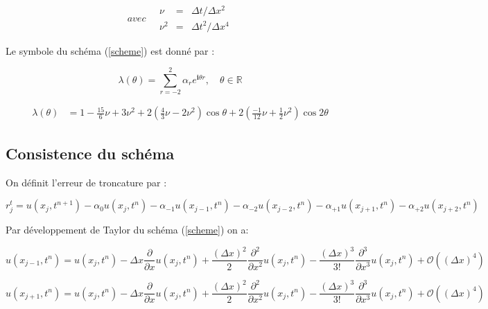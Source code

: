 \documentclass[a4paper,11pt]{article}
\begin{document}
\begin{equation*}
    avec \quad
    \begin{array}{rcl}
        \nu &=& \Delta t/\Delta x^{2} \\
        \nu^{2} &=& \Delta t^{2}/\Delta x^{4}
    \end{array}
\end{equation*}

Le symbole du schéma (\ref{scheme}) est donné par :

\begin{equation*}
    \lambda(\theta) = \sum \limits_{r=-2}^{2} \alpha_{r} e^{\mathbf{i} \theta r}, \quad \theta \in \mathbb{R}
\end{equation*}

\begin{equation}
    \begin{split}
        \lambda(\theta) &= 1 - \frac{15}{6} \nu + 3 \nu^{2} +
        2 \left( \frac{4}{3} \nu - 2 \nu^{2} \right) \cos{\theta} +
        2 \left( \frac{-1}{12} \nu + \frac{1}{2} \nu^{2} \right) \cos{2\theta}
    \end{split}
\end{equation}


\subsection{Consistence du schéma}

On définit l'erreur de troncature par :

\begin{equation*}
    r^{t}_{j} = u(x_{j}, t^{n+1}) -\alpha_{0} u(x_{j}, t^{n}) -\alpha_{-1} u(x_{j-1}, t^{n}) -\alpha_{-2} u(x_{j-2}, t^{n}) -\alpha_{+1} u(x_{j+1}, t^{n}) -\alpha_{+2} u(x_{j+2}, t^{n})
\end{equation*}

Par développement de Taylor du schéma (\ref{scheme}) on a:

\begin{equation*}
    u(x_{j-1}, t^{n}) =
    u(x_{j}, t^{n})
     - \Delta x \frac{\partial}{\partial x}u(x_{j}, t^{n})
     + \frac{(\Delta x)^{2}}{2} \frac{\partial^{2}}{\partial x^{2}}u(x_{j}, t^{n})
     - \frac{(\Delta x)^{3}}{3!} \frac{\partial^{3}}{\partial x^{3}}u(x_{j}, t^{n})
     + \mathcal{O}((\Delta x)^{4})
\end{equation*}

\begin{equation*}
    u(x_{j+1}, t^{n}) =
    u(x_{j}, t^{n})
     - \Delta x \frac{\partial}{\partial x}u(x_{j}, t^{n})
     + \frac{(\Delta x)^{2}}{2} \frac{\partial^{2}}{\partial x^{2}}u(x_{j}, t^{n})
     - \frac{(\Delta x)^{3}}{3!} \frac{\partial^{3}}{\partial x^{3}}u(x_{j}, t^{n})
     + \mathcal{O}((\Delta x)^{4})
\end{equation*}
\end{document}
